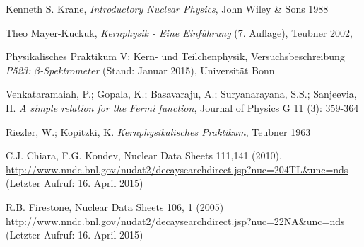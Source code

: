 \documentclass[11pt, a4paper]{article}
\numberwithin{equation}{section}
\begin{document}
\clearpage
\vspace{\fill}
\begin{thebibliography}{19}
	Kenneth S. Krane,
	\emph{Introductory Nuclear Physics},
	John Wiley \& Sons 1988

	Theo Mayer-Kuckuk,
	\emph{Kernphysik - Eine Einführung} (7. Auflage),
	Teubner 2002,

	Physikalisches Praktikum V: Kern- und Teilchenphysik,
	Versuchsbeschreibung \emph{P523: $\beta$-Spektrometer} (Stand: Januar 2015),
	Universität Bonn	

	Venkataramaiah, P.; Gopala, K.; Basavaraju, A.; Suryanarayana, S.S.; Sanjeevia, H.
	\emph{A simple relation for the Fermi function},
	Journal of Physics G 11 (3): 359-364

	Riezler, W.; Kopitzki, K.
	\emph{Kernphysikalisches Praktikum},
	Teubner 1963

  C.J. Chiara, F.G. Kondev,
  Nuclear Data Sheets 111,141 (2010),
  \url{http://www.nndc.bnl.gov/nudat2/decaysearchdirect.jsp?nuc=204TL&unc=nds}
  (Letzter Aufruf: 16. April 2015)

  R.B. Firestone,
  Nuclear Data Sheets 106, 1 (2005)
  \url{http://www.nndc.bnl.gov/nudat2/decaysearchdirect.jsp?nuc=22NA&unc=nds}
  (Letzter Aufruf: 16. April 2015)




  

\end{thebibliography}

\clearpage
\end{document}
